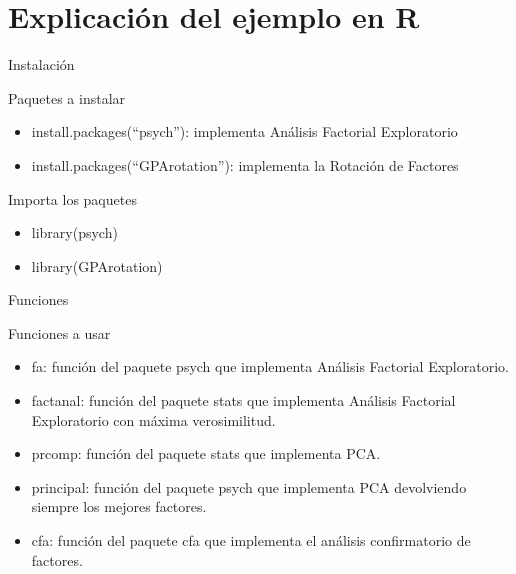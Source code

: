 \documentclass[10pt]{beamer}
\begin{document}
\section{Explicación del ejemplo en R}

\begin{frame}[fragile]{Instalación}
	\vspace{10px}
	\pause
	\begin{block}{Paquetes a instalar}
		\begin{itemize}
			\item install.packages(``psych''): implementa Análisis Factorial Exploratorio
			\pause
			\item install.packages(``GPArotation''): implementa la Rotación de Factores
			\pause
		\end{itemize}
	\end{block}
	\vspace{10px}
	\pause
	\begin{alertblock}{Importa los paquetes}
		\begin{itemize}
			\item library(psych)
			\pause
			\item library(GPArotation)
			\pause
		\end{itemize}
	\end{alertblock}
\end{frame}

\begin{frame}[fragile]{Funciones}
\vspace{10px}
\pause
{}
\begin{block}{Funciones a usar}
	\begin{itemize}
		\item fa: función del paquete psych que implementa Análisis Factorial Exploratorio.
		\pause
		\item factanal: función del paquete stats que implementa Análisis Factorial Exploratorio con máxima verosimilitud.
		\pause
		\item prcomp: función del paquete stats que implementa PCA.
		\pause
		\item principal: función del paquete psych que implementa PCA devolviendo siempre los mejores factores.
		\item cfa: función del paquete cfa que implementa el análisis confirmatorio de factores.
		\pause
	\end{itemize}
\end{block}
\end{frame}
\end{document}
